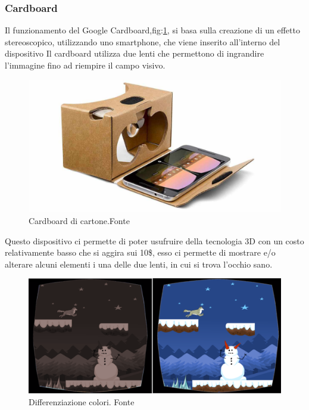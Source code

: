 \documentclass[10pt,a4paper]{article}
\begin{document}
	\subsubsection{Cardboard}\label{chap:cardboard}
    Il funzionamento del Google Cardboard,fig:\ref{fig:cardboard}, si basa sulla creazione di un effetto stereoscopico\cite{Stereoscopio}, utilizzando uno smartphone, che viene inserito all'interno del dispositivo
	Il cardboard utilizza due lenti che permettono di ingrandire l'immagine fino ad riempire il campo visivo\cite{Funzionamento_cardboard}.
	\begin{figure}[H]
		\centering
		\includegraphics[width=0.8\linewidth]{image/cardboard}
		\caption{Cardboard di cartone.Fonte\cite{Cardboard_image}}
		\label{fig:cardboard}
	\end{figure}
	Questo dispositivo ci permette di poter usufruire della tecnologia 3D con un costo relativamente basso che si aggira sui 10\$, esso ci permette di mostrare e/o alterare alcuni elementi i una delle due lenti, in cui si trova l'occhio sano. 
	\begin{figure}[H]
		\centering
		\includegraphics[width=0.8\linewidth]{image/3D4Amb_1}
		\caption{Differenziazione colori.
			Fonte\cite{3d4amb_image}}
		\label{fig:cardboard-3D4Amb_colori}
	\end{figure}
   
\end{document}
